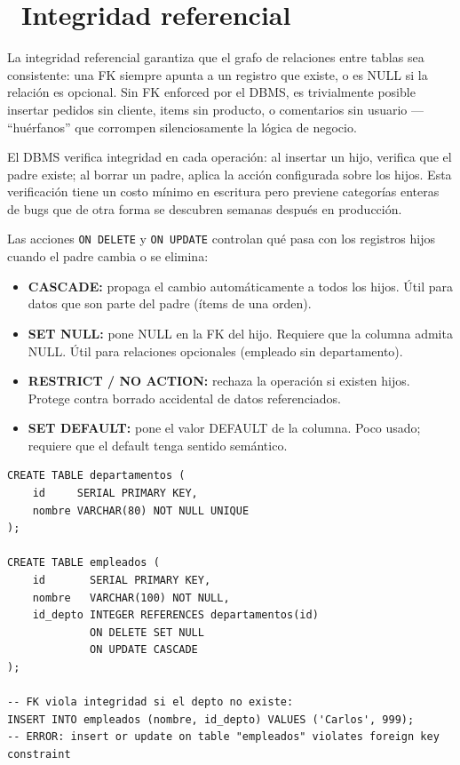 \section[Integridad referencial]{~Integridad referencial}

La integridad referencial garantiza que el grafo de relaciones entre tablas sea consistente: una FK siempre apunta a un registro que existe, o es NULL si la relación es opcional.
Sin FK enforced por el DBMS, es trivialmente posible insertar pedidos sin cliente, items sin producto, o comentarios sin usuario — ``huérfanos'' que corrompen silenciosamente la lógica de negocio.

El DBMS verifica integridad en cada operación: al insertar un hijo, verifica que el padre existe; al borrar un padre, aplica la acción configurada sobre los hijos.
Esta verificación tiene un costo mínimo en escritura pero previene categorías enteras de bugs que de otra forma se descubren semanas después en producción.

Las acciones \texttt{ON DELETE} y \texttt{ON UPDATE} controlan qué pasa con los registros hijos cuando el padre cambia o se elimina:
\begin{itemize}
  \item \textbf{CASCADE:} propaga el cambio automáticamente a todos los hijos. Útil para datos que son parte del padre (ítems de una orden).
  \item \textbf{SET NULL:} pone NULL en la FK del hijo. Requiere que la columna admita NULL. Útil para relaciones opcionales (empleado sin departamento).
  \item \textbf{RESTRICT / NO ACTION:} rechaza la operación si existen hijos. Protege contra borrado accidental de datos referenciados.
  \item \textbf{SET DEFAULT:} pone el valor DEFAULT de la columna. Poco usado; requiere que el default tenga sentido semántico.
\end{itemize}

\begin{lstlisting}[caption={PK, FK e integridad referencial}]
CREATE TABLE departamentos (
    id     SERIAL PRIMARY KEY,
    nombre VARCHAR(80) NOT NULL UNIQUE
);

CREATE TABLE empleados (
    id       SERIAL PRIMARY KEY,
    nombre   VARCHAR(100) NOT NULL,
    id_depto INTEGER REFERENCES departamentos(id)
             ON DELETE SET NULL
             ON UPDATE CASCADE
);

-- FK viola integridad si el depto no existe:
INSERT INTO empleados (nombre, id_depto) VALUES ('Carlos', 999);
-- ERROR: insert or update on table "empleados" violates foreign key constraint
\end{lstlisting}

